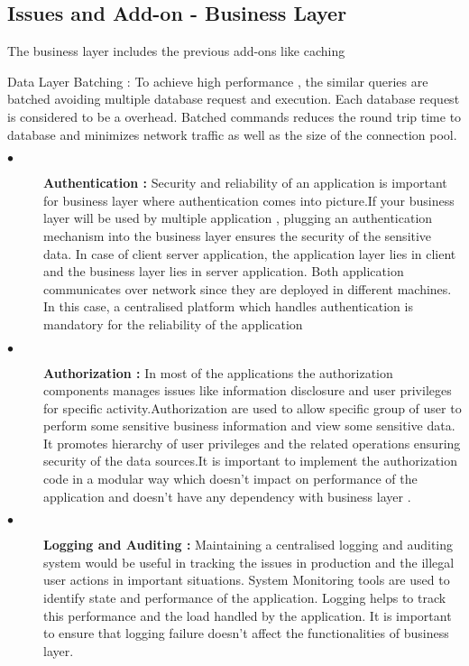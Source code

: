 \subsection{Issues and Add-on - Business Layer}	
  		The business layer includes the previous add-ons like caching 
  		



Data Layer
Batching : To achieve high performance , the similar queries are batched avoiding multiple database request and execution. Each database request is considered to be a overhead. Batched commands reduces the round trip time to database and minimizes network traffic as well as the size of the connection pool.


\begin{description}
  \item[$\bullet$]{\bfseries Authentication : } Security and reliability of an application is important for business layer where authentication comes into picture.If your business layer will be used by multiple application , plugging an  authentication mechanism  into the business layer ensures the security of the sensitive data. In case of client server application, the application layer lies in client and the business layer lies in server application. Both application communicates over network since they are deployed in different machines. In this case, a centralised platform which handles authentication is mandatory for the reliability of the application
  \item[$\bullet$]{\bfseries Authorization :} In most of the applications the authorization components manages issues like information disclosure and user privileges for specific activity.Authorization are used to allow specific group of user to perform some sensitive business information and view some sensitive data. It promotes hierarchy of user privileges and the related operations ensuring security of the data sources.It is important to implement the authorization code in a modular way which doesn’t  impact on performance of the application and doesn’t have any dependency with business layer .
  \item[$\bullet$]{\bfseries Logging and Auditing :}  Maintaining a centralised logging and auditing system would be useful in tracking the issues in production and the illegal user actions in important situations. System Monitoring tools are used to identify state and performance of the application. Logging helps to track this performance and the load handled by the application. It is important to ensure that logging failure doesn’t affect the functionalities of business layer.   
\end{description}  

